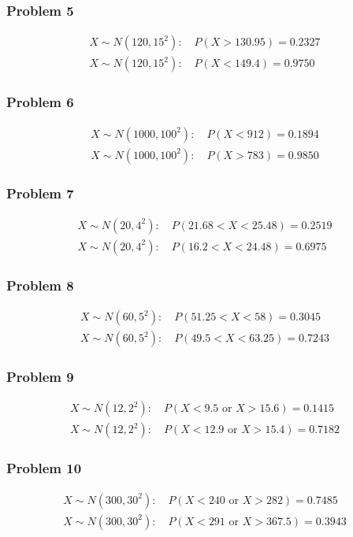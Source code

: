 \subsubsection{Problem 5}
\[
\begin{array}{l}
	X\sim N(120,15^2):\quad P(X>130.95)=0.2327\\
	X\sim N(120,15^2):\quad P(X<149.4)=0.9750
\end{array}
\]

\subsubsection{Problem 6}
\[
\begin{array}{l}
	X\sim N(1000,100^2):\quad P(X<912)=0.1894\\
	X\sim N(1000,100^2):\quad P(X>783)=0.9850
\end{array}
\]

\subsubsection{Problem 7}
\[
\begin{array}{l}
	X\sim N(20,4^2):\quad P(21.68<X<25.48)=0.2519\\
	X\sim N(20,4^2):\quad P(16.2<X<24.48)=0.6975
\end{array}
\]

\subsubsection{Problem 8}
\[
\begin{array}{l}
	X\sim N(60,5^2):\quad P(51.25<X<58)=0.3045\\
	X\sim N(60,5^2):\quad P(49.5<X<63.25)=0.7243
\end{array}
\]

\subsubsection{Problem 9}
\[
\begin{array}{l}
	X\sim N(12,2^2):\quad P(X<9.5\text{ or }X>15.6)=0.1415\\
	X\sim N(12,2^2):\quad P(X<12.9\text{ or }X>15.4)=0.7182
\end{array}
\]

\subsubsection{Problem 10}
\[
\begin{array}{l}
	X\sim N(300,30^2):\quad P(X<240\text{ or }X>282)=0.7485\\
	X\sim N(300,30^2):\quad P(X<291\text{ or }X>367.5)=0.3943
\end{array}
\]

